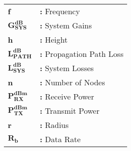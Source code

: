\hspace{-4mm}
\begin{tabular}{p{2cm}l}
{\bf f} & {\bf:} Frequency\\[1ex]
$\mathbf{G^{dB}_{SYS}}$ & {\bf:} System Gains\\[1ex]
{\bf h} & {\bf:} Height\\[1ex]
$\mathbf{L^{dB}_{PATH}}$ & {\bf:} Propagation Path Loss\\[1ex]
$\mathbf{L^{dB}_{SYS}}$ & {\bf:} System Losses\\[1ex]
{\bf n} & {\bf:} Number of Nodes\\[1ex]
$\mathbf{P^{dBm}_{RX}}$ & {\bf:} Receive Power\\[1ex]
$\mathbf{P^{dBm}_{TX}}$ & {\bf:} Transmit Power\\[1ex]
{\bf r} & {\bf:} Radius\\[1ex]
$\mathbf{R_{b}}$ & {\bf:} Data Rate\\[1ex]
\end{tabular}
